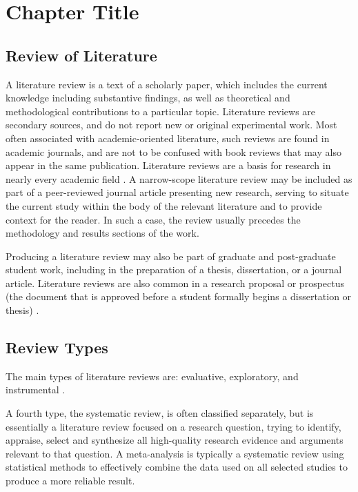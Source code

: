 \chapter{Chapter Title} \label{c2}
\section{Review of Literature}
A literature review is a text of a scholarly paper, which includes the current knowledge including substantive findings, as well as theoretical and methodological contributions to a particular topic. Literature reviews are secondary sources, and do not report new or original experimental work. Most often associated with academic-oriented literature, such reviews are found in academic journals, and are not to be confused with book reviews that may also appear in the same publication. Literature reviews are a basis for research in nearly every academic field \citep{maedche2001ontology}. A narrow-scope literature review may be included as part of a peer-reviewed journal article presenting new research, serving to situate the current study within the body of the relevant literature and to provide context for the reader. In such a case, the review usually precedes the methodology and results sections of the work.

Producing a literature review may also be part of graduate and post-graduate student work, including in the preparation of a thesis, dissertation, or a journal article. Literature reviews are also common in a research proposal or prospectus (the document that is approved before a student formally begins a dissertation or thesis) \citep{doan2002learning, duzdevich2014dna}.

\section{Review Types}
The main types of literature reviews are: evaluative, exploratory, and instrumental \citep{duzdevich2014dna, thiruganam2010automatic}.

A fourth type, the systematic review, is often classified separately, but is essentially a literature review focused on a research question, trying to identify, appraise, select and synthesize all high-quality research evidence and arguments relevant to that question. A meta-analysis is typically a systematic review using statistical methods to effectively combine the data used on all selected studies to produce a more reliable result.


